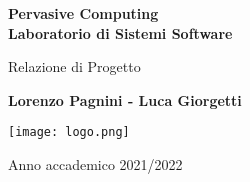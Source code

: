 \begin{titlepage}
    \begin{center}
        \vspace*{1cm}
        
        \Huge
        \textbf{Pervasive Computing \\ Laboratorio di Sistemi Software}
        
        \vspace{0.5cm}
        \LARGE
        Relazione di Progetto
        
        \vspace{1.0cm}
        \textbf{Lorenzo Pagnini - Luca Giorgetti}
        
        \vspace{1.5cm}
        \texttt{[image: logo.png]}
        
        \vspace{0.5cm}
        \LARGE
        Anno accademico 2021/2022
    
    \end{center}
\end{titlepage}